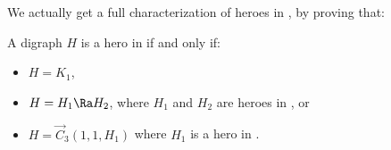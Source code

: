 \medskip

We actually get a full characterization of heroes in \omgs, by proving that:
\begin{theorem}\label{thm:main_multipartite}
A digraph $H$ is a hero in \omgs  if and only if:
\begin{itemize}
    \item $H= K_1$, 
    \item $H=H_1 \Ra H_2$, where $H_1$ and $H_2$ are heroes in \omgs, or
    \item $H=\vec C_{3}(1, 1, H_1)$ where $H_1$ is a hero in \omgs.
\end{itemize}
\end{theorem}






